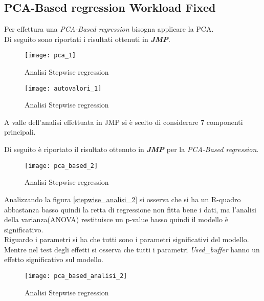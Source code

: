 \clearpage

\subsection{PCA-Based regression Workload Fixed}

Per effettura una \textit{PCA-Based regression} bisogna applicare la PCA.\\
Di seguito sono riportati i risultati ottenuti in \textbf{\textit{JMP}}.\\

\begin{figure}[!htbp]
  \centering
  \texttt{[image: pca\_1]}
  \caption{Analisi Stepwise regression}
  \label{pca_2}
\end{figure}

\begin{figure}[!htbp]
  \centering
  \texttt{[image: autovalori\_1]}
  \caption{Analisi Stepwise regression}
  \label{autovalori_2}
\end{figure}

A valle dell'analisi effettuata in JMP si è scelto di considerare 7 componenti
principali.\\

\clearpage

Di seguito è riportato il risultato ottenuto in \textbf{\textit{JMP}} per
la \textit{PCA-Based regression}.\\

\begin{figure}[!htbp]
  \centering
  \texttt{[image: pca\_based\_2]}
  \caption{Analisi Stepwise regression}
  \label{pca_based_2}
\end{figure}

\clearpage

Analizzando la figura \ref{stepwise_analisi_2} si osserva che si ha un R-quadro
abbastanza basso quindi la retta di regressione non fitta bene i dati, ma l'analisi
della varianza(ANOVA) restituisce un p-value basso quindi il modello è significativo.\\
Riguardo i parametri si ha che tutti sono i parametri significativi
del modello.\\
Mentre nel test degli effetti si osserva che tutti i parametri \textit{Used\_buffer}
hanno un effetto significativo sul modello.\\

\begin{figure}[!htbp]
  \centering
  \texttt{[image: pca\_based\_analisi\_2]}
  \caption{Analisi Stepwise regression}
  \label{pca_based_analisi_2}
\end{figure}
